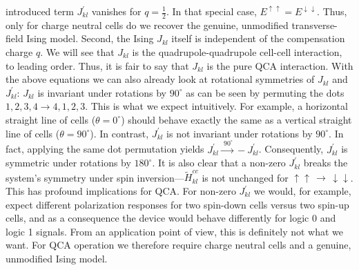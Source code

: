 introduced term $J^{\prime}_{kl}$ vanishes for $q=\frac{1}{2}$. In that special case,
$E^{\uparrow\uparrow} = E^{\downarrow\downarrow}$. Thus, only for charge neutral
cells do we recover the genuine, unmodified transverse-field Ising model. Second,
the Ising $J_{kl}$ itself is independent of the compensation charge $q$. We
will see that $J_{kl}$ is the quadrupole-quadrupole cell-cell interaction, to
leading order. Thus, it is fair to say that $J_{kl}$ is the pure QCA
interaction. With the above equations we can also already look at rotational
symmetries of $J_{kl}$ and $J^{\prime}_{kl}$: $J_{kl}$ is invariant under
rotations by $90^{\circ}$ as can be seen by permuting the dots $1,2,3,4
\rightarrow 4,1,2,3$. This is what we expect intuitively. For example, a
horizontal straight line of cells ($\theta = 0^{\circ}$) should behave exactly
the same as a vertical straight line of cells ($\theta = 90^{\circ}$). In
contrast, $J^{\prime}_{kl}$ is not invariant under rotations by $90^{\circ}$. In
fact, applying the same dot permutation yields $J^{\prime}_{kl}
\xrightarrow{\,\, 90^{\circ}} - J^{\prime}_{kl}$. Consequently,
$J^{\prime}_{kl}$ is symmetric under rotations by $180^{\circ}$. It is also
clear that a non-zero $J^{\prime}_{kl}$ breaks the system's symmetry under spin
inversion---$\tilde{H}^{cc}_{kl}$ is not unchanged for $\uparrow\uparrow \,
\rightarrow \, \downarrow\downarrow$. This has profound implications for QCA.
For non-zero $J^{\prime}_{kl}$ we would, for example, expect different
polarization responses for two spin-down cells versus two spin-up cells, and as
a consequence the device would behave differently for logic 0 and logic 1
signals. From an application point of view, this is definitely not what we want.
For QCA operation we therefore require charge neutral cells and a genuine,
unmodified Ising model.

